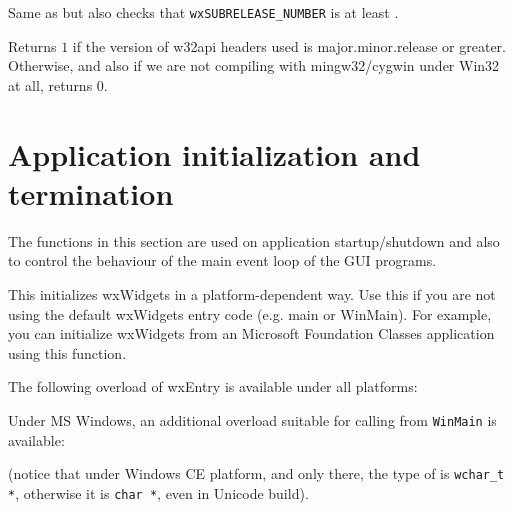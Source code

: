 \label{wxcheckversionfull}


Same as  but also checks that
\texttt{wxSUBRELEASE\_NUMBER} is at least .


\label{wxcheckw32apiversion}


Returns $1$ if the version of w32api headers used is major.minor.release or
greater. Otherwise, and also if we are not compiling with mingw32/cygwin under
Win32 at all, returns $0$.



\section{Application initialization and termination}\label{appinifunctions}

The functions in this section are used on application startup/shutdown and also
to control the behaviour of the main event loop of the GUI programs.


\label{wxentry}

This initializes wxWidgets in a platform-dependent way. Use this if you are not
using the default wxWidgets entry code (e.g. main or WinMain). For example, you
can initialize wxWidgets from an Microsoft Foundation Classes application using
this function.

The following overload of wxEntry is available under all platforms:


Under MS Windows, an additional overload suitable for calling from 
\texttt{WinMain} is available:


(notice that under Windows CE platform, and only there, the type of 
 is \texttt{wchar\_t *}, otherwise it is \texttt{char *}, even in
Unicode build).



